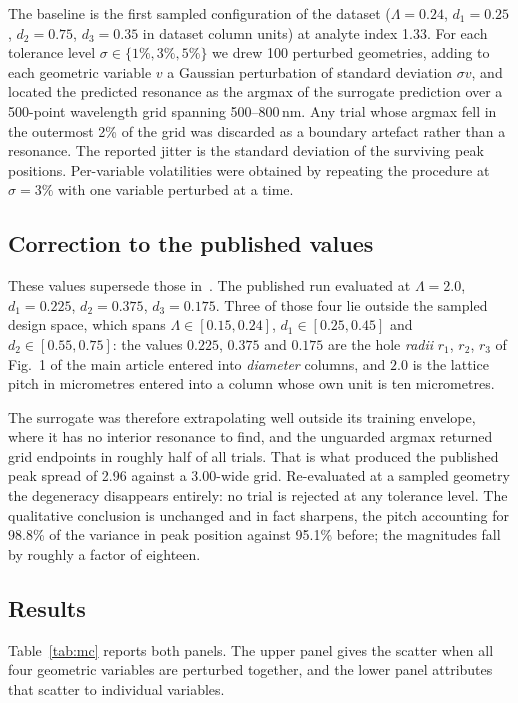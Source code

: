 \documentclass[pdflatex,sn-basic,Numbered]{sn-jnl}
\begin{document}
The baseline is the first sampled configuration of the dataset
($\Lambda = 0.24$, $d_1 = 0.25$, $d_2 = 0.75$, $d_3 = 0.35$ in dataset column
units) at analyte index 1.33. For each tolerance level
$\sigma \in \{1\%, 3\%, 5\%\}$ we drew 100 perturbed geometries, adding to each
geometric variable $v$ a Gaussian perturbation of standard deviation $\sigma v$,
and located the predicted resonance as the argmax of the surrogate prediction
over a 500-point wavelength grid spanning 500--800\,nm. Any trial whose argmax
fell in the outermost 2\% of the grid was discarded as a boundary artefact
rather than a resonance. The reported jitter is the standard deviation of the
surviving peak positions. Per-variable volatilities were obtained by repeating
the procedure at $\sigma = 3\%$ with one variable perturbed at a time.

\subsection{Correction to the published values}\label{sup:mc_correction}

These values supersede those in~\cite{hammoud2026siu}. The published run
evaluated at $\Lambda = 2.0$, $d_1 = 0.225$, $d_2 = 0.375$, $d_3 = 0.175$. Three
of those four lie outside the sampled design space, which spans
$\Lambda \in [0.15, 0.24]$, $d_1 \in [0.25, 0.45]$ and $d_2 \in [0.55, 0.75]$:
the values $0.225$, $0.375$ and $0.175$ are the hole \emph{radii}
$r_1$, $r_2$, $r_3$ of Fig.~1 of the main article entered into \emph{diameter}
columns, and $2.0$ is the lattice pitch in micrometres entered into a column
whose own unit is ten micrometres.

The surrogate was therefore extrapolating well outside its training envelope,
where it has no interior resonance to find, and the unguarded argmax returned
grid endpoints in roughly half of all trials. That is what produced the
published peak spread of 2.96 against a 3.00-wide grid. Re-evaluated at a
sampled geometry the degeneracy disappears entirely: no trial is rejected at any
tolerance level. The qualitative conclusion is unchanged and in fact sharpens,
the pitch accounting for 98.8\% of the variance in peak position against 95.1\%
before; the magnitudes fall by roughly a factor of eighteen.

\subsection{Results}

Table~\ref{tab:mc} reports both panels. The upper panel gives the scatter when
all four geometric variables are perturbed together, and the lower panel
attributes that scatter to individual variables.
\end{document}

